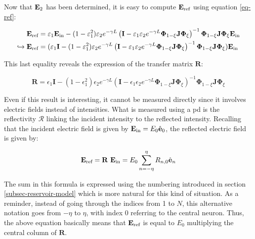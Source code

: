 Now that $\mathbf{E}_{\text{2}}$ has been determined, it is easy to compute $\mathbf{E}_{\text{ref}}$ using equation \eqref{eq-ref}:

\begin{align}
	\mathbf{E}_{\text{ref}} &= \varepsilon_1 \mathbf{E}_{\text{in}} - (1-\varepsilon_1^2) \varepsilon_2 e^{-\gamma L} \left( \mathbf{I} - \varepsilon_1 \varepsilon_2 e^{- \gamma L} \mathbf{\Phi}_{1-\xi} \mathbf{J} \mathbf{\Phi}_\xi \right)^{-1} \mathbf{\Phi}_{1-\xi} \mathbf{J} \mathbf{\Phi}_\xi \mathbf{E}_{\text{in}} \nonumber \\
	\hookrightarrow \mathbf{E}_{\text{ref}} &= (\varepsilon_1 \mathbf{I} - (1-\varepsilon_1^2) \varepsilon_2 e^{-\gamma L} \left( \mathbf{I} - \varepsilon_1 \varepsilon_2 e^{- \gamma L} \mathbf{\Phi}_{1-\xi} \mathbf{J} \mathbf{\Phi}_\xi \right)^{-1} \mathbf{\Phi}_{1-\xi} \mathbf{J} \mathbf{\Phi}_\xi) \mathbf{E}_{\text{in}}
\end{align}

This last equality reveals the expression of the transfer matrix $\mathbf{R}$:

\begin{equation}
	\boxed{\mathbf{R} = \epsilon_1 \mathbf{I} - (1-\epsilon_1^2) \epsilon_2 e^{-\gamma L} \left( \mathbf{I} - \epsilon_1 \epsilon_2 e^{- \gamma L} \mathbf{\Phi}_{1-\xi} \mathbf{J} \mathbf{\Phi}_\xi \right)^{-1} \mathbf{\Phi}_{1-\xi} \mathbf{J} \mathbf{\Phi}_\xi}
\end{equation}

Even if this result is interesting, it cannot be measured directly since it involves electric fields instead of intensities. What is measured using a \gls{pd} is the reflectivity $\mathcal{R}$ linking the incident intensity to the reflected intensity. Recalling that the incident electric field is given by $\mathbf{E}_{\text{in}} = E_0 \hat{\mathbf{e}}_0$, the reflected electric field is given by:

\begin{equation}
	\mathbf{E}_{\text{ref}} = \mathbf{R}~\mathbf{E}_{\text{in}} = E_0\sum_{n=-\eta}^\eta R_{n,0} \hat{\mathbf{e}}_n
\end{equation}

The sum in this formula is expressed using the numbering introduced in section \ref{subsec-reservoir-model} which is more natural for this kind of situation. As a reminder, instead of going through the indices from 1 to $N$, this alternative notation goes from $-\eta$ to $\eta$, with index 0 referring to the central neuron. Thus, the above equation basically means that $\mathbf{E}_{\text{ref}}$ is equal to $E_0$ multiplying the central column of $\mathbf{R}$.\\

